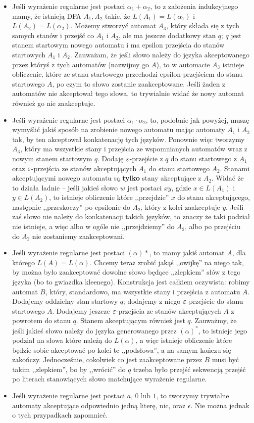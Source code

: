 \begin{itemize}
	\item Jeśli wyrażenie regularne jest postaci \( \alpha_1 + \alpha_2 \), to z założenia indukcyjnego mamy, że istnieją DFA \(A_1, A_2\) takie, że \(L(A_1) = L(\alpha_1)\) i \(L(A_2) = L(\alpha_2)\). Możemy stworzyć automat \(A_3\), który składa się z tych samych stanów i przejść co \(A_1\) i \(A_2\), ale ma jeszcze dodatkowy stan \(q\); \(q\) jest stanem startowym nowego automatu i ma epsilon przejścia do stanów startowych \(A_1\) i \(A_2\).  Zauważam, że jeśli słowo należy do języka akceptowanego przez któryś z tych automatów (nazwijmy go \(A\)), to w automacie \(A_3\) istnieje obliczenie, które ze stanu startowego przechodzi epsilon-przejściem do stanu startowego \(A\), po czym to słowo zostanie zaakceptowane. Jeśli żaden z automatów nie akceptował tego słowa, to trywialnie widać że nowy automat również go nie zaakceptuje.
	\item Jeśli wyrażenie regularne jest postaci \( \alpha_1 \cdot \alpha_2 \), to, podobnie jak powyżej, muszę wymyślić jakiś sposób na zrobienie nowego automatu mając automaty \(A_1\) i \(A_2\) tak, by ten akceptował konkatenację tych języków. Ponownie więc tworzymy \(A_3\), który ma wszystkie stany i przejścia ze wspomnianych automatów wraz z nowym stanem startowym \(q\). Dodaję \(\varepsilon\)-przejście z \(q\) do stanu startowego z \(A_1\) oraz \(\varepsilon\)-przejścia ze stanów akceptujących \(A_1\) do stanu startowego \(A_2\). Stanami akceptującymi nowego automatu są \textbf{tylko} stany akceptujące z \(A_2\). Widać że to działa ładnie -- jeśli jakieś słowo \(w\) jest postaci \(xy\), gdzie \(x\in L(A_1)\) i \(y \in L(A_2)\), to istnieje obliczenie które ,,przejdzie'' \(x\) do stanu akceptującego, następnie ,,przeskoczy'' po epsilonie do \(A_2\), który z kolei zaakceptuje \(y\). Jeśli zaś słowo nie należy do konkatenacji takich języków, to znaczy że taki podział nie istnieje, a więc albo w ogóle nie ,,przejdziemy'' do \(A_2\), albo po przejściu do \(A_2\) nie zostaniemy zaakceptowani.
	\item Jeśli wyrażenie regularne jest postaci \((\alpha)*\), to mamy jakiś automat \(A\), dla którego \(L(A) = L(\alpha)\). Chcemy teraz zrobić jakąś ,,owijkę'' na niego tak, by można było zaakceptować dowolne słowo będące ,,zlepkiem'' słów z tego języka (bo to gwiazdka kleenego). Konstrukcja jest całkiem oczywista: robimy automat \(B\), który, standardowo, ma wszystkie stany i przejścia z automatu \(A\). Dodajemy oddzielny stan startowy \(q\); dodajemy z niego \(\varepsilon\)-przejście do stanu startowego \(A\). Dodajemy jeszcze \(\varepsilon\)-przejścia ze stanów akceptujących \(A\) z powrotem do stanu \(q\). Stanem akceptującym również jest \(q\). Zauważmy, że jeśli jakieś słowo należy do języka generowanego przez \((\alpha)^*\), to istnieje jego podział na słowa które należą do \(L(\alpha)\), a więc istnieje obliczenie które będzie sobie akceptować po kolei te ,,podsłowa'', a na samym kończu się zakończy. Jednocześnie, cokolwiek co jest zaakceptowane przez \(B\) musi być takim ,,zlepkiem'', bo by ,,wrócić'' do \(q\) trzeba było przejść sekwencją przejść po literach stanowiących słowo matchujące wyrażenie regularne.
	\item Jeśli wyrażenie regularne jest postaci \( a \), \( 0 \) lub \( 1 \), to tworzymy trywialne automaty akceptujące odpowiednio jedną literę, nic, oraz \( \epsilon \). Nie można jednak o tych przypadkach zapomnieć.
\end{itemize}

